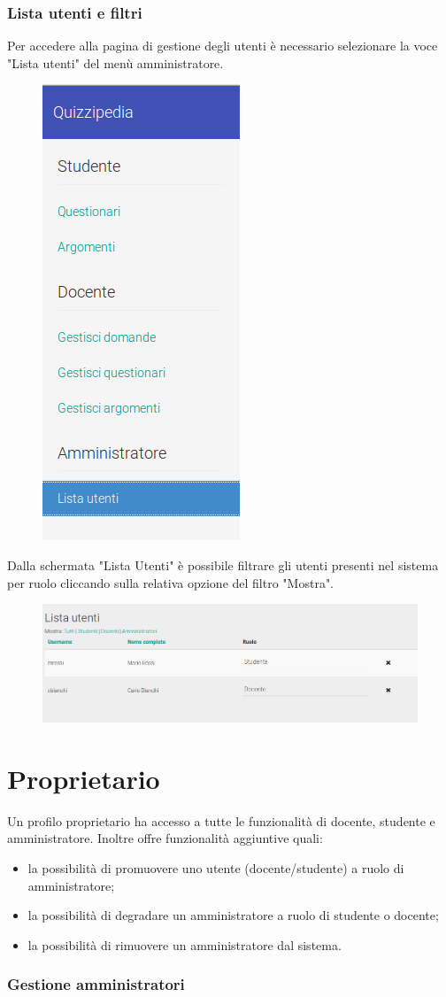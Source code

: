 \documentclass[12pt,a4paper]{article}
\begin{document}
		\subsubsection{Lista utenti e filtri}
		Per accedere alla pagina di gestione degli utenti è necessario selezionare la voce "Lista utenti" del menù amministratore.
		\begin{figure}[h]
			\centering
			\includegraphics[width=0.2\linewidth]{../img/screenshot/usersList_menu.png}
			\caption{}
			\label{Lista utenti}
		\end{figure}
        Dalla schermata "Lista Utenti" è possibile filtrare gli utenti presenti nel sistema per ruolo cliccando sulla relativa opzione del filtro "Mostra".
		\begin{figure}[h]
			
			\centering
			\includegraphics[width=1.0\linewidth]{../img/screenshot/usersList_crop.png}
			\caption{}
			\label{Lista utenti}
		\end{figure}
		
	\TODO{}
	\TODO{}
	\TODO{}
	\TODO{}
	
	\section{Proprietario} 
	Un profilo proprietario ha accesso a tutte le funzionalità di docente, studente e amministratore.
	Inoltre offre funzionalità aggiuntive quali:
	\begin{itemize}
		\item la possibilità di promuovere uno utente (docente/studente) a ruolo di amministratore;
		\item la possibilità di degradare un amministratore a ruolo di studente o docente;
		\item la possibilità di rimuovere un amministratore dal sistema.
	\end{itemize}
	
	\subsubsection{Gestione  amministratori}
	\TODO{}

	
\end{document}
